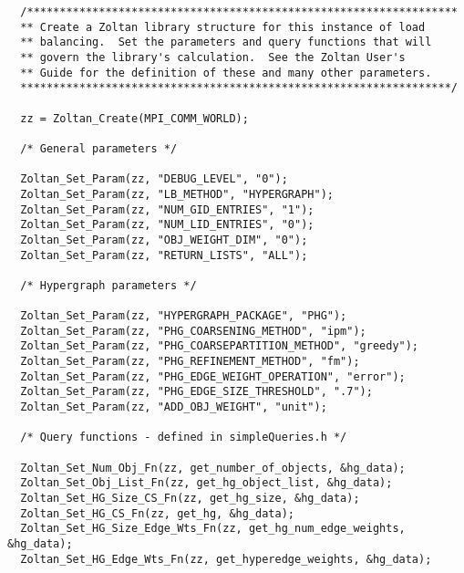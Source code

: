 \clearpage
\begin{flushleft}
\begin{verbatim}
  /******************************************************************
  ** Create a Zoltan library structure for this instance of load
  ** balancing.  Set the parameters and query functions that will
  ** govern the library's calculation.  See the Zoltan User's
  ** Guide for the definition of these and many other parameters.
  ******************************************************************/

  zz = Zoltan_Create(MPI_COMM_WORLD);

  /* General parameters */

  Zoltan_Set_Param(zz, "DEBUG_LEVEL", "0");
  Zoltan_Set_Param(zz, "LB_METHOD", "HYPERGRAPH");
  Zoltan_Set_Param(zz, "NUM_GID_ENTRIES", "1"); 
  Zoltan_Set_Param(zz, "NUM_LID_ENTRIES", "0");
  Zoltan_Set_Param(zz, "OBJ_WEIGHT_DIM", "0");
  Zoltan_Set_Param(zz, "RETURN_LISTS", "ALL");

  /* Hypergraph parameters */

  Zoltan_Set_Param(zz, "HYPERGRAPH_PACKAGE", "PHG"); 
  Zoltan_Set_Param(zz, "PHG_COARSENING_METHOD", "ipm");
  Zoltan_Set_Param(zz, "PHG_COARSEPARTITION_METHOD", "greedy");
  Zoltan_Set_Param(zz, "PHG_REFINEMENT_METHOD", "fm");
  Zoltan_Set_Param(zz, "PHG_EDGE_WEIGHT_OPERATION", "error"); 
  Zoltan_Set_Param(zz, "PHG_EDGE_SIZE_THRESHOLD", ".7"); 
  Zoltan_Set_Param(zz, "ADD_OBJ_WEIGHT", "unit"); 

  /* Query functions - defined in simpleQueries.h */

  Zoltan_Set_Num_Obj_Fn(zz, get_number_of_objects, &hg_data);
  Zoltan_Set_Obj_List_Fn(zz, get_hg_object_list, &hg_data);
  Zoltan_Set_HG_Size_CS_Fn(zz, get_hg_size, &hg_data);
  Zoltan_Set_HG_CS_Fn(zz, get_hg, &hg_data);
  Zoltan_Set_HG_Size_Edge_Wts_Fn(zz, get_hg_num_edge_weights, &hg_data);
  Zoltan_Set_HG_Edge_Wts_Fn(zz, get_hyperedge_weights, &hg_data);
\end{verbatim}
\end{flushleft}

